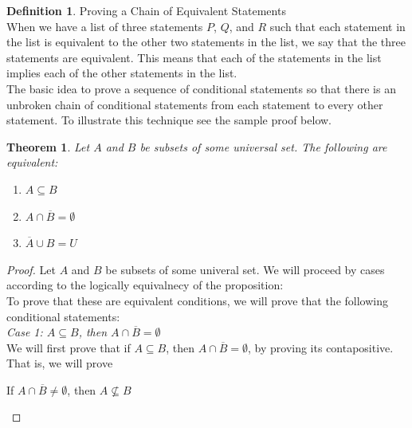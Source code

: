 \documentclass{book}
\newtheorem{theorem}{Theorem}[section]
\theoremstyle{definition}
\newtheorem{definition}{Definition}[section]
\theoremstyle{remark}
\begin{document}
\newpage
\begin{definition}
Proving a Chain of Equivalent Statements \\

    When we have a list of three statements $P$, $Q$, and $R$ such that each statement in the list is equivalent to the other two statements in the list, we say that the three statements are equivalent. This means that each of the statements in the list implies each of the other statements in the list. \\
    The basic idea to prove a sequence of conditional statements so that there is an unbroken chain of conditional statements from each statement to every other statement. To illustrate this technique see the sample proof below. 

        \begin{tcolorbox}
            \begin{theorem}
                Let $A$ and $B$ be subsets of some universal set. The following are equivalent:  
                    \begin{enumerate}
                        \item $A \subseteq B$
                        \item $A \cap \overline{B} = \emptyset$
                        \item $\overline{A} \cup B = U$
                    \end{enumerate}
            \end{theorem}
        \end{tcolorbox}
        
        \begin{proof}
             Let $A$ and $B$ be subsets of some univeral set. We will proceed by cases according to the logically equivalnecy of the proposition: \\  
             
             To prove that these are equivalent conditions, we will prove that the following conditional statements: \\
             
             
             \textit{Case 1: $A \subseteq B$, then $A \cap \overline{B} = \emptyset$} \\
                 We will first prove that if $A \subseteq B$, then $A \cap \overline{B} = \emptyset$, by proving its contapositive. That is, we will prove
                    \begin{center}
                        If $A \cap \overline{B} \neq \emptyset$, then $A \nsubseteq B$
                    \end{center}
                

\end{proof}
\end{definition}
\end{document}
